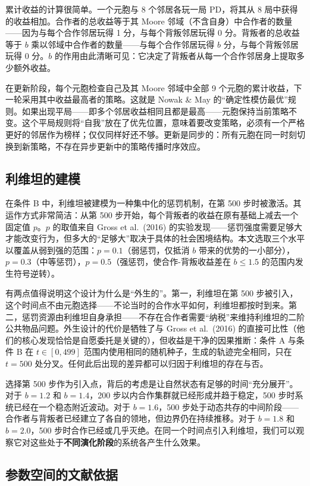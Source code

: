 \documentclass[12pt,a4paper]{ctexart}
\begin{document}
累计收益的计算很简单。一个元胞与 8 个邻居各玩一局 PD，将其从 8 局中获得的收益相加。合作者的总收益等于其 Moore 邻域（不含自身）中合作者的数量——因为与每个合作邻居玩得 1 分，与每个背叛邻居玩得 0 分。背叛者的总收益等于 $b$ 乘以邻域中合作者的数量——与每个合作邻居玩得 $b$ 分，与每个背叛邻居玩得 0 分。$b$ 的作用由此清晰可见：它决定了背叛者从每一个合作邻居身上提取多少额外收益。

在更新阶段，每个元胞检查自己及其 Moore 邻域中全部 9 个元胞的累计收益，下一轮采用其中收益最高者的策略。这就是 Nowak \& May 的“确定性模仿最优”规则。如果出现平局——即多个邻居收益相同且都是最高——元胞保持当前策略不变。这个平局规则将“自我”放在了优先位置，意味着要改变策略，必须有一个严格更好的邻居作为榜样；仅仅同样好还不够。更新是同步的：所有元胞在同一时刻切换到新策略，不存在异步更新中的策略传播时序效应。

\subsection{利维坦的建模}

在条件 B 中，利维坦被建模为一种集中化的惩罚机制，在第 500 步时被激活。其运作方式非常简洁：从第 500 步开始，每个背叛者的收益在原有基础上减去一个固定值 $p$。$p$ 的取值来自 Gross et al.\ (2016) 的实验发现——惩罚强度需要足够大才能改变行为，但多大的“足够大”取决于具体的社会困境结构。本文选取三个水平以覆盖从弱到强的范围：$p = 0.1$（弱惩罚，仅抵消 $b$ 带来的优势的一小部分），$p = 0.3$（中等惩罚），$p = 0.5$（强惩罚，使合作-背叛收益差在 $b \le 1.5$ 的范围内发生符号逆转）。

有两点值得说明这个设计为什么是“外生的”。第一，利维坦在第 500 步被引入，这个时间点不由元胞选择——不论当时的合作水平如何，利维坦都按时到来。第二，惩罚资源由利维坦自身承担——不存在合作者需要“纳税”来维持利维坦的二阶公共物品问题。外生设计的代价是牺牲了与 Gross et al.\ (2016) 的直接可比性（他们的核心发现恰恰是自愿委托是关键的），但收益是干净的因果推断：条件 A 与条件 B 在 $t \in [0, 499]$ 范围内使用相同的随机种子，生成的轨迹完全相同，只在 $t=500$ 处分叉。任何此后出现的差异都可以归因于利维坦的存在与否。

选择第 500 步作为引入点，背后的考虑是让自然状态有足够的时间“充分展开”。对于 $b=1.2$ 和 $b=1.4$，200 步以内合作集群就已经形成并趋于稳定，500 步时系统已经在一个稳态附近波动。对于 $b=1.6$，500 步处于动态共存的中间阶段——合作者与背叛者已经建立了各自的领地，但边界仍在持续推移。对于 $b=1.8$ 和 $b=2.0$，500 步时合作已经或几乎灭绝。在同一个时间点引入利维坦，我们可以观察它对这些处于\textbf{不同演化阶段}的系统各产生什么效果。

\subsection{参数空间的文献依据}
\end{document}
